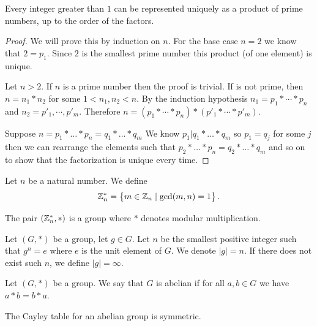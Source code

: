 \documentclass[11pt,a4paper]{article}
\begin{document}
  \begin{proposition}
    Every integer greater than $1$ can be represented uniquely as a product of
    prime numbers, up to the order of the factors.
  \end{proposition}
  \begin{proof}
    We will prove this by induction on $n$.
  	For the base case $n = 2$ we know that $2 = p_1$.
    Since $2$ is the smallest prime number this product (of one element) is
    unique.

	  Let $n > 2$.
    If $n$ is a prime number then the proof is trivial.
    If is not prime, then $n = n_1 * n_2$ for some $1 < n_1, n_2 < n$. 
    By the induction hypothesis $n_1 = p_1 * \cdots * p_n$ and 
    $n_2 = p'_1, \cdots, p'_m$. 
    Therefore $n = (p_1 * \cdots * p_n) * (p'_1 * \cdots * p'_m)$.

    Suppose $n = p_1*\ldots *p_n=q_1*\ldots *q_m$
    We know $p_1|q_1*\ldots *q_m$ so $p_1=q_j$ for some $j$ 
    then we can rearrange the elements such that 
    $p_2*\ldots *p_n = q_2*\ldots *q_m$ and so on to show that
    the factorization is unique every time.
  \end{proof}
	
  \begin{definition}
    Let $n$ be a natural number.
    We define
    \[
      \mathbb{Z}^*_n = \left\{m \in \mathbb{Z}_n \mid \gcd(m,n) = 1\right\}.
    \]
  \end{definition}
  \begin{proposition}
    The pair $(\mathbb{Z}^*_n, *)$ is a group where $*$ denotes modular multiplication.
  \end{proposition}

  \begin{definition}
    Let $(G,*)$ be a group, let $g \in G$.
    Let $n$ be the smallest positive integer such that $g^n = e$ where
    $e$ is the unit element of $G$. We denote $|g| = n$.
    If there does not exist such $n$, we define $|g| = \infty$.
  \end{definition}
  
  \begin{definition}
    Let $(G,*)$ be a group. We say that $G$ is abelian if for all $a,b \in G$
    we have $a * b = b * a$.
  \end{definition}
  \begin{remark}
  	The Cayley table for an abelian group is symmetric.
  \end{remark}
\end{document}
